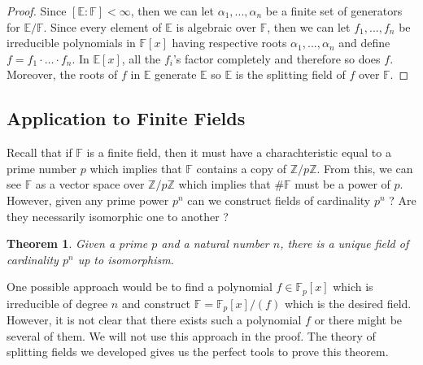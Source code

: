 \documentclass{article}
\newtheorem*{theorem}{Theorem}
\newcommand{\F}{\mathbb{F}}
\newcommand{\E}{\mathbb{E}}
\newcommand{\Zn}[1]{\mathbb{Z}/ #1 \mathbb{Z}}
\begin{document}
\begin{proof}
    Since $[\E : \F] < \infty$, then we can let $\alpha_1, ..., \alpha_n$ be a finite set of generators for $\E / \F$. Since every element of $\E$ is algebraic over $\F$, then we can let $f_1, ..., f_n$ be irreducible polynomials in $\F[x]$ having respective roots $\alpha_1, ..., \alpha_n$ and define $f = f_1 \cdot \dots \cdot f_n$. In $\E[x]$, all the $f_i$'s factor completely and therefore so does $f$. Moreover, the roots of $f$ in $\E$ generate $\E$ so $\E$ is the splitting field of $f$ over $\F$.
\end{proof}

\subsection{Application to Finite Fields}

Recall that if $\F$ is a finite field, then it must have a charachteristic equal to a prime number $p$ which implies that $\F$ contains a copy of $\Zn{p}$. From this, we can see $\F$ as a vector space over $\Zn{p}$ which implies that $\# \F$ must be a power of $p$. However, given any prime power $p^n$ can we construct fields of cardinality $p^n$ ? Are they necessarily isomorphic one to another ?

\begin{theorem}
    Given a prime $p$ and a natural number $n$, there is a unique field of cardinality $p^n$ up to isomorphism.
\end{theorem}

One possible approach would be to find a polynomial $f \in \F_p[x]$ which is irreducible of degree $n$ and construct $\F = \F_p[x] / (f)$ which is the desired field. However, it is not clear that there exists such a polynomial $f$ or there might be several of them. We will not use this approach in the proof. The theory of splitting fields we developed gives us the perfect tools to prove this theorem. 
\end{document}
